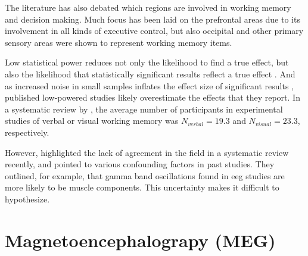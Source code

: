 The literature has also debated which regions are involved in working memory and decision making.
Much focus has been laid on the prefrontal areas due to its involvement in all kinds of executive control, but also occipital and other primary sensory areas were shown to represent working memory items.

Low statistical power reduces not only the likelihood to find a true effect, but also the likelihood that statistically significant results reflect a true effect \citep{button2013power}.
And as increased noise in small samples inflates the effect size of significant results \citep{loken2017measurement}, published low-powered studies likely overestimate the effects that they report.
In a systematic review by \citet{pavlov2022oscillatory}, the average number of participants in experimental studies of verbal or visual working memory was $N_{verbal}=19.3$ and $N_{visual}=23.3$, respectively.

However, \citet{pavlov2022oscillatory} highlighted the lack of agreement in the field in a systematic review recently, and pointed to various confounding factors in past studies. They outlined, for example, that gamma band oscillations found in \gls{eeg} studies are more likely to be muscle components.
This uncertainty makes it difficult to hypothesize.

\section{Magnetoencephalograpy (MEG)}

